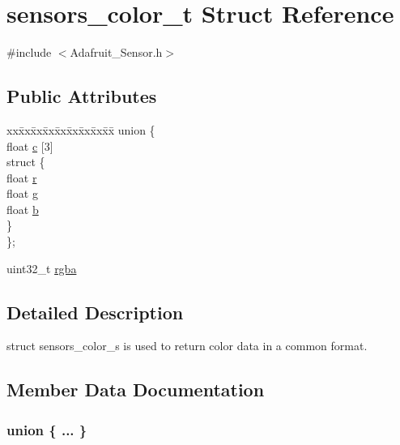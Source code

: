 \hypertarget{structsensors__color__t}{}\section{sensors\+\_\+color\+\_\+t Struct Reference}
\label{structsensors__color__t}


{\ttfamily \#include $<$Adafruit\+\_\+\+Sensor.\+h$>$}

\subsection*{Public Attributes}
\begin{DoxyCompactItemize}
\item 
\begin{tabbing}
xx\=xx\=xx\=xx\=xx\=xx\=xx\=xx\=xx\=\kill
union \{\\
\>float \hyperlink{structsensors__color__t_a4d76803c2e83303f611cf2a7910eaf17}{c} \mbox{[}3\mbox{]}\\
\>struct \{\\
\>\>float \hyperlink{structsensors__color__t_acdeed981e7df8c701e09d4b2fdb9a40c}{r}\\
\>\>float \hyperlink{structsensors__color__t_ac91ecea980718cf134f60c497d2a0049}{g}\\
\>\>float \hyperlink{structsensors__color__t_a1bf461b5c728e323f8883a3785c7c60b}{b}\\
\>\} \\
\}; \\

\end{tabbing}\item 
uint32\+\_\+t \hyperlink{structsensors__color__t_a0afbff980c17fbacdab1666735f3d3e6}{rgba}
\end{DoxyCompactItemize}


\subsection{Detailed Description}
struct sensors\+\_\+color\+\_\+s is used to return color data in a common format. 

\subsection{Member Data Documentation}
\subsubsection[{\texorpdfstring{"@7}{@7}}]{\setlength{\rightskip}{0pt plus 5cm}union \{ ... \} }\hypertarget{structsensors__color__t_a713da7fcd97cbfeb045b7477716b730c}{}\label{structsensors__color__t_a713da7fcd97cbfeb045b7477716b730c}
